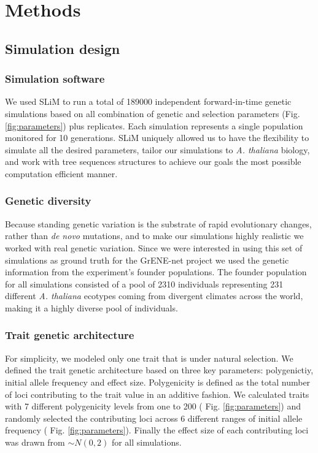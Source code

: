 \documentclass{article}
\begin{document}
\section{Methods}

\subsection{Simulation design}
\subsubsection{Simulation software}
We used SLiM \citep{Haller2019-oj} to run a total of 189000 independent forward-in-time genetic simulations based on all combination of genetic and selection parameters (Fig. \ref{fig:parameters}) plus replicates. Each simulation represents a single population monitored for 10 generations. SLiM uniquely allowed us to have the flexibility to simulate all the desired parameters, tailor our simulations to \textit{A. thaliana} biology, and work with tree sequences structures to achieve our goals the most possible computation efficient manner.

\subsubsection{Genetic diversity}
Because standing genetic variation is the substrate of rapid evolutionary changes, rather than \textit{de novo} mutations, and to make our simulations highly realistic we worked with real genetic variation. Since we were interested in using this set of simulations as ground truth for the GrENE-net project we used the genetic information from the experiment's founder populations. The founder population for all simulations consisted of a pool of 2310 individuals representing 231 different \textit{A. thaliana} ecotypes coming from divergent climates across the world, making it a highly diverse pool of individuals. 

\subsubsection{Trait genetic architecture}
For simplicity, we modeled only one trait that is under natural selection. We defined the trait genetic architecture based on three key parameters: polygenictiy, initial allele frequency and effect size. Polygenicity is defined as the total number of loci contributing to the trait value in an additive fashion. We calculated traits with 7 different polygenicity levels from one to 200 ( Fig. \ref{fig:parameters}) and randomly selected the contributing loci across 6 different ranges of initial allele frequency ( Fig. \ref{fig:parameters}). Finally the effect size of each contributing loci was drawn from \( \sim N(0, 2) \) for all simulations.
\end{document}
